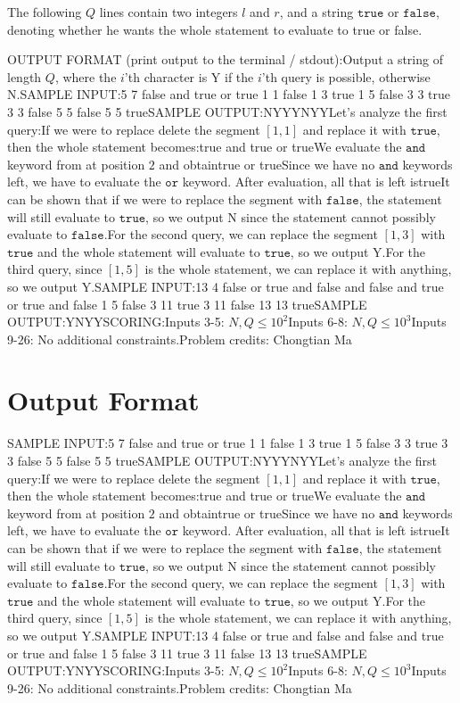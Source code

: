 \documentclass[12pt]{article}
\begin{document}
The following $Q$ lines contain two integers $l$ and $r$, and a string
$\texttt{true}$ or $\texttt{false}$, denoting whether he wants the whole
statement to evaluate to true or false.

OUTPUT FORMAT (print output to the terminal / stdout):Output a string of length $Q$, where the $i$'th character is Y if the $i$'th
query is possible, otherwise N.SAMPLE INPUT:5 7
false and true or true
1 1 false
1 3 true
1 5 false
3 3 true
3 3 false
5 5 false
5 5 trueSAMPLE OUTPUT:NYYYNYYLet's analyze the first query:If we were to replace delete the segment $[1, 1]$ and replace it with
$\texttt{true}$, then the whole statement becomes:true and true or trueWe evaluate the $\texttt{and}$ keyword from at position $2$ and obtaintrue or trueSince we have no $\texttt{and}$ keywords left, we have to evaluate the
$\texttt{or}$ keyword. After evaluation, all that is left istrueIt can be shown that if we were to replace the segment with $\texttt{false}$,
the statement will still evaluate to $\texttt{true}$, so we output N since the
statement cannot possibly evaluate to $\texttt{false}$.For the second query, we can replace the segment $[1, 3]$ with $\texttt{true}$
and the whole statement will evaluate to $\texttt{true}$, so we output Y.For the third query, since $[1, 5]$ is the whole statement, we can replace it
with anything, so we output Y.SAMPLE INPUT:13 4
false or true and false and false and true or true and false
1 5 false
3 11 true
3 11 false
13 13 trueSAMPLE OUTPUT:YNYYSCORING:Inputs 3-5: $N,Q\le 10^2$Inputs 6-8: $N,Q\le 10^3$Inputs 9-26: No additional constraints.Problem credits: Chongtian Ma

\section*{Output Format}
SAMPLE INPUT:5 7
false and true or true
1 1 false
1 3 true
1 5 false
3 3 true
3 3 false
5 5 false
5 5 trueSAMPLE OUTPUT:NYYYNYYLet's analyze the first query:If we were to replace delete the segment $[1, 1]$ and replace it with
$\texttt{true}$, then the whole statement becomes:true and true or trueWe evaluate the $\texttt{and}$ keyword from at position $2$ and obtaintrue or trueSince we have no $\texttt{and}$ keywords left, we have to evaluate the
$\texttt{or}$ keyword. After evaluation, all that is left istrueIt can be shown that if we were to replace the segment with $\texttt{false}$,
the statement will still evaluate to $\texttt{true}$, so we output N since the
statement cannot possibly evaluate to $\texttt{false}$.For the second query, we can replace the segment $[1, 3]$ with $\texttt{true}$
and the whole statement will evaluate to $\texttt{true}$, so we output Y.For the third query, since $[1, 5]$ is the whole statement, we can replace it
with anything, so we output Y.SAMPLE INPUT:13 4
false or true and false and false and true or true and false
1 5 false
3 11 true
3 11 false
13 13 trueSAMPLE OUTPUT:YNYYSCORING:Inputs 3-5: $N,Q\le 10^2$Inputs 6-8: $N,Q\le 10^3$Inputs 9-26: No additional constraints.Problem credits: Chongtian Ma
\end{document}
